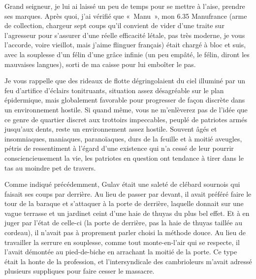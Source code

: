 %
%
Grand seigneur, je lui ai laissé un peu de temps pour se mettre à l’aise, prendre ses marques. Après quoi, j’ai vérifié que «~Manu~», mon 6.35 Manufrance (arme de collection, chargeur sept coups qu’il convient de vider d’une traite sur l’agresseur pour s’assurer d’une réelle efficacité létale, pas très moderne, je vous l’accorde, voire vieillot, mais j’aime flinguer français) était chargé à bloc et suis, avec la souplesse d’un félin d’une grâce infinie (un peu empâté, le félin, diront les mauvaises langues), sorti de ma caisse pour lui emboîter le pas.

Je vous rappelle que des rideaux de flotte dégringolaient du ciel illuminé par un feu d’artifice d’éclairs tonitruants, situation assez désagréable sur le plan épidermique, mais globalement favorable pour progresser de façon discrète dans un environnement hostile. \label{rat:5}Si quand même, vous ne m’enlèverez pas de l’idée que ce genre de quartier discret aux trottoirs impeccables, peuplé de patriotes armés jusqu’aux dents, reste un environnement assez hostile. Souvent âgés et insomniaques, maniaques, paranoïaques, durs de la feuille et à moitié aveugles, pétris de ressentiment à l’égard d’une existence qui n’a cessé de leur pourrir consciencieusement la vie, les patriotes en question ont tendance à tirer dans le tas au moindre pet de travers.

Comme indiqué précédemment, Gulav était une saleté de clébard sournois qui faisait ses coups par derrière. Au lieu de passer par devant, il avait préféré faire le tour de la baraque et s’attaquer à la porte de derrière, laquelle donnait sur une vague terrasse et un jardinet ceint d’une haie de thuyas du plus bel effet. Et à en juger par l’état de celle-ci (la porte de derrière, pas la haie de thuyas taillée au cordeau), il n’avait pas à proprement parler choisi la méthode douce. Au lieu de travailler la serrure en souplesse, comme tout monte-en-l’air qui se respecte, il l’avait démontée au pied-de-biche en arrachant la moitié de la porte. Ce type était la honte de la profession, et l’intersyndicale des cambrioleurs m’avait adressé plusieurs suppliques pour faire cesser le massacre.

